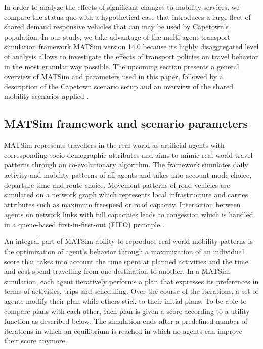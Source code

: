 \documentclass[a4paper]{article}
\begin{document}
In order to analyze the effects of significant changes to mobility services, we compare the status quo with a hypothetical case that introduces a large fleet of shared demand responsive vehicles that can may be used by Capetown's population. In our study, we take advantage of the multi-agent transport simulation framework MATSim version 14.0 because its highly disaggregated level of analysis allows to investigate the effects of transport policies on travel behavior in the most granular way possible. The upcoming section presents a general overview of MATSim and parameters used in this paper, followed by a description of the Capetown scenario setup and an overview of the shared mobility scenarios applied \citep{Horni.2016}.

\subsection*{MATSim framework and scenario parameters}

MATSim represents travellers in the real world as artificial agents with corresponding socio-demographic attributes and aims to mimic real world travel patterns through an co-evolutionary algorithm. The framework simulates daily activity and mobility patterns of all agents and takes into account mode choice, departure time and route choice.  Movement patterns of road vehicles are simulated on a network graph which represents local infrastructure and carries attributes such as maximum freespeed or road capacity. Interaction between agents on network links with full capacities leads to congestion which is handled in a queue-based first-in-first-out (FIFO) principle \citep{Horni.2016}. 

An integral part of MATSim ability to reproduce real-world mobility patterns is the optimization of agent's behavior through a maximization of an individual score that takes into account the time spent at planned activities and the time and cost spend travelling from one destination to another. In a MATSim simulation, each agent iteratively performs a plan that expresses its preferences in terms of activities, trips and scheduling. Over the course of the iterations, a set of agents modify their plan while others stick to their initial plans. To be able to compare plans with each other, each plan is given a score according to a utility function as described below. The simulation ends after a predefined number of iterations in which an equilibrium is reached in which no agents can improve their score anymore. \\ 
\end{document}
